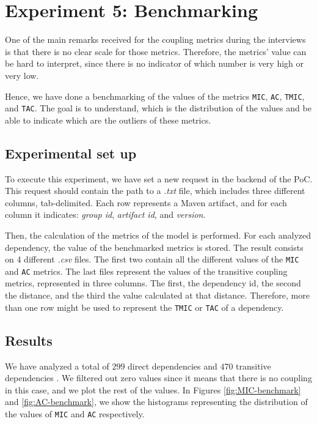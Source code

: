 \section{Experiment 5: Benchmarking}
One of the main remarks received for the coupling metrics during the interviews is that there is no clear scale for those metrics. Therefore, the metrics' value can be hard to interpret, since there is no indicator of which number is very high or very low.

Hence, we have done a benchmarking of the values of the metrics \texttt{MIC}, \texttt{AC}, \texttt{TMIC}, and \texttt{TAC}. The goal is to understand, which is the distribution of the values and be able to indicate which are the outliers of these metrics.

\subsection{Experimental set up}
To execute this experiment, we have set a new request in the backend of the PoC. This request should contain the path to a \textit{.txt} file, which includes three different columns, tab-delimited. Each row represents a Maven artifact, and for each column it indicates: \textit{group id}, \textit{artifact id}, and \textit{version}.

Then, the calculation of the metrics of the model is performed. For each analyzed dependency, the value of the benchmarked metrics is stored. The result consists on 4 different \textit{.csv} files. The first two contain all the different values of the \texttt{MIC} and \texttt{AC} metrics. The last files represent the values of the transitive coupling metrics, represented in three columns. The first, the dependency id, the second the distance, and the third the value calculated at that distance. Therefore, more than one row might be used to represent the \texttt{TMIC} or \texttt{TAC} of a dependency.

\subsection{Results}

We have analyzed a total of $299$ direct dependencies and $470$ transitive dependencies . We filtered out zero values since it means that there is no coupling in this case, and we plot the rest of the values. In Figures \ref{fig:MIC-benchmark} and \ref{fig:AC-benchmark}, we show the histograms representing the distribution of the values of \texttt{MIC} and \texttt{AC} respectively.

